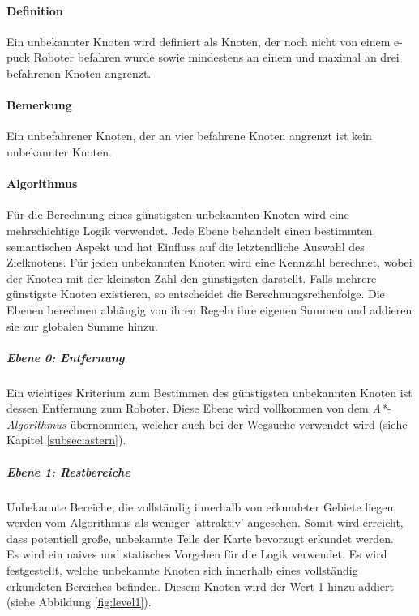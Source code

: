 \documentclass[10pt,a4paper]{article}
\begin{document}
			\paragraph*{Definition} Ein unbekannter Knoten wird definiert als Knoten, der noch nicht von einem e-puck Roboter befahren wurde
				sowie mindestens an einem und maximal an drei befahrenen Knoten angrenzt.
			\paragraph*{Bemerkung} Ein unbefahrener Knoten, der an vier befahrene Knoten angrenzt ist kein unbekannter Knoten.
			\paragraph*{Algorithmus}Für die Berechnung eines günstigsten unbekannten Knoten wird eine mehrschichtige Logik verwendet.
				Jede Ebene behandelt einen bestimmten semantischen Aspekt und hat Einfluss auf die letztendliche Auswahl des Zielknotens. Für
				jeden unbekannten Knoten wird eine Kennzahl berechnet, wobei der Knoten mit der kleinsten Zahl den günstigsten darstellt. Falls
				mehrere günstigste Knoten existieren, so entscheidet die Berechnungsreihenfolge. Die Ebenen berechnen abhängig von ihren Regeln
				ihre eigenen Summen und addieren sie zur globalen Summe hinzu.
				\subparagraph*{Ebene 0: Entfernung} Ein wichtiges Kriterium zum Bestimmen des günstigsten unbekannten Knoten ist dessen
					Entfernung zum Roboter. Diese Ebene wird vollkommen von dem \textit{A*-Algorithmus} 
					übernommen, welcher auch bei der Wegsuche verwendet wird (siehe Kapitel \ref{subsec:astern}).
  				\subparagraph*{Ebene 1: Restbereiche} Unbekannte Bereiche, die vollständig innerhalb von erkundeter Gebiete liegen, werden vom
  					Algorithmus als weniger 'attraktiv' angesehen. Somit wird erreicht, dass potentiell große, unbekannte Teile der Karte
  					bevorzugt erkundet werden. \\
  					Es wird ein naives und statisches Vorgehen für die Logik verwendet. Es wird festgestellt, welche unbekannte Knoten sich innerhalb
  					eines vollständig erkundeten Bereiches befinden. Diesem Knoten wird der Wert 1 hinzu addiert (siehe Abbildung \ref{fig:level1}).  			
\end{document}
